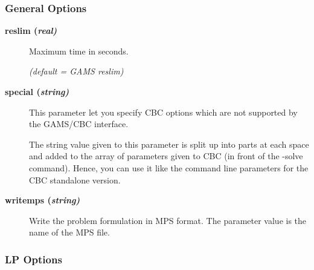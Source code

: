 \subsubsection{General Options}

\begin{description}

\item[\label{reslim}\hypertarget{reslim}
{\textbf{reslim (\slshape{real})}}]\hspace{1.0in}

Maximum time in seconds.

\textsl{(default = GAMS reslim)}

\item[\label{special}\hypertarget{special}
{\textbf{special (\slshape{string})}}]\hspace{1.0in}

This parameter let you specify CBC options which are not supported by the GAMS/CBC interface.

The string value given to this parameter is split up into parts at each space and added to the array of parameters given to CBC (in front of the -solve command).
Hence, you can use it like the command line parameters for the CBC standalone version.


\item[\label{writemps}\hypertarget{writemps}
{\textbf{writemps (\slshape{string})}}]\hspace{1.0in}

Write the problem formulation in MPS format.
The parameter value is the name of the MPS file.

\end{description}

\subsubsection{LP Options}

